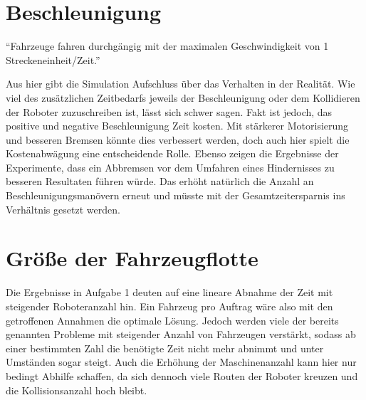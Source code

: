 \documentclass[ngerman]{tudscrreprt}
\begin{document}
\section{Beschleunigung}
\begin{displayquote}
    ``Fahrzeuge fahren durchgängig mit der maximalen Geschwindigkeit von 1
    Streckeneinheit/Zeit.'' \cite{aufgabenstellung}
\end{displayquote}
%
Aus hier gibt die Simulation Aufschluss über das Verhalten in der Realität. Wie viel des
zusätzlichen Zeitbedarfs jeweils der Beschleunigung oder dem Kollidieren der Roboter
zuzuschreiben ist, lässt sich schwer sagen. Fakt ist jedoch, das positive und negative
Beschleunigung Zeit kosten. Mit stärkerer Motorisierung und besseren Bremsen könnte dies
verbessert werden, doch auch hier spielt die Kostenabwägung eine entscheidende Rolle.
Ebenso zeigen die Ergebnisse der Experimente, dass ein Abbremsen vor dem Umfahren eines
Hindernisses zu besseren Resultaten führen würde. Das erhöht natürlich die Anzahl an
Beschleunigungsmanövern erneut und müsste mit der Gesamtzeitersparnis ins
Verhältnis gesetzt werden.

\section{Größe der Fahrzeugflotte}
Die Ergebnisse in Aufgabe 1 deuten auf eine lineare Abnahme der Zeit mit steigender
Roboteranzahl hin. Ein Fahrzeug pro Auftrag wäre also mit den getroffenen Annahmen die
optimale Lösung. Jedoch werden viele der bereits genannten Probleme mit steigender Anzahl
von Fahrzeugen verstärkt, sodass ab einer bestimmten Zahl die benötigte Zeit nicht mehr
abnimmt und unter Umständen sogar steigt. Auch die Erhöhung der Maschinenanzahl kann hier
nur bedingt Abhilfe schaffen, da sich dennoch viele Routen der Roboter kreuzen und die
Kollisionsanzahl hoch bleibt.



\end{document}
